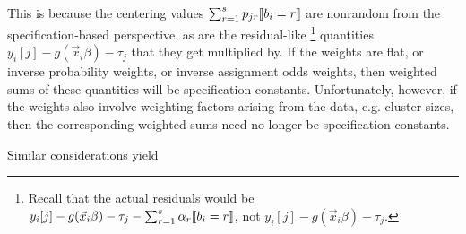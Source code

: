 \documentclass{article}
\DeclarePairedDelimiter{\indicator}{\llbracket}{\rrbracket}
\begin{document}
This is because the centering values
$\sum_{r=1}^{s}p_{jr}\indicator{b_{i}=r}$ are nonrandom from the
specification-based perspective, as are the residual-like%
\footnote{Recall that the actual residuals would be $y_{i}[j] -
  g(\vec{x}_{i}\beta) - \tau_{j} - \sum_{r=1}^{s}\alpha_{r}\indicator{b_{i}=r}$, not $y_{i}[j] - g(\vec{x}_{i}\beta) - \tau_{j}$.}
quantities
$y_{i}[j] - g(\vec{x}_{i}\beta) - \tau_{j}$ that they get
multiplied by.   If the weights are flat, or inverse probability
weights, or inverse assignment odds weights, then weighted sums of
these quantities will be specification constants.  Unfortunately, however, if
the weights also involve weighting factors arising from the data,
e.g. cluster sizes, then the corresponding weighted sums need no
longer be specification constants.

Similar considerations yield
\end{document}
